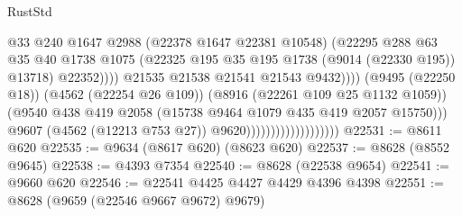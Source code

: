 \begin{lexlean}{RustStd}
\begin{coremodule}
                                                          @33
                                                          @240
                                                          @1647
                                                          @2988
                                                          (@22378 @1647 @22381 @10548)
                                                          (@22295
                                                            @288
                                                            @63
                                                            @35
                                                            @40
                                                            @1738
                                                            @1075
                                                            (@22325
                                                              @195
                                                              @35
                                                              @195
                                                              @1738
                                                              (@9014 (@22330 @195))
                                                              @13718)
                                                            @22352))))
                                                    @21535
                                                    @21538
                                                    @21541
                                                    @21543
                                                    @9432))))
                                            (@9495 (@22250 @18))
                                            (@4562 (@22254 @26 @109))
                                            (@8916 (@22261 @109 @25 @1132 @1059))
                                            (@9540
                                              @438
                                              @419
                                              @2058
                                              (@15738 @9464 @1079 @435 @419 @2057 @15750)))
                                          @9607
                                          (@4562 (@12213 @753 @27))
                                          @9620)))))))))))))))))))
@22531 := @8611 @620
@22535 := @9634 (@8617 @620) (@8623 @620)
@22537 := @8628 (@8552 @9645)
@22538 := @4393 @7354
@22540 := @8628 (@22538 @9654)
@22541 := @9660 @620
@22546 := @22541 @4425 @4427 @4429 @4396 @4398
@22551 := @8628 (@9659 (@22546 @9667 @9672) @9679)

\end{coremodule}
\end{lexlean}
